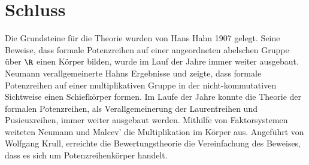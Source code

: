 \chapter{Schluss}
Die Grundsteine für die Theorie wurden von Hans Hahn 1907 gelegt. Seine Beweise, dass formale Potenzreihen auf einer angeordneten abelschen Gruppe über $\R$ einen Körper bilden, wurde im Lauf der Jahre immer weiter ausgebaut. Neumann verallgemeinerte Hahns Ergebnisse und zeigte, dass formale Potenzreihen auf einer multiplikativen Gruppe in der nicht-kommutativen Sichtweise einen Schiefkörper formen. Im Laufe der Jahre konnte die Theorie der formalen Potenzreihen, als Verallgemeinerung der Laurentreihen und Pusieuxreihen, immer weiter ausgebaut werden. Mithilfe von Faktorsystemen weiteten Neumann und Malcev' die Multiplikation im Körper aus. Angeführt von Wolfgang Krull, erreichte die Bewertungstheorie die Vereinfachung des Beweises, dass es sich um Potenzreihenkörper handelt.  
